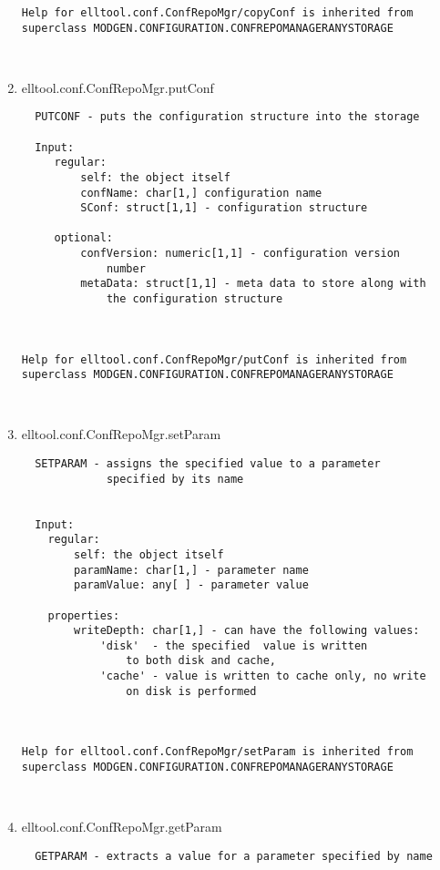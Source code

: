 \begin{enumerate}
\begin{lstlisting}
Help for elltool.conf.ConfRepoMgr/copyConf is inherited from superclass MODGEN.CONFIGURATION.CONFREPOMANAGERANYSTORAGE



\end{lstlisting}
\fontfamily{\familydefault}
\selectfont
\item {elltool.conf.ConfRepoMgr.putConf}
\selectfont
\begin{lstlisting}
  PUTCONF - puts the configuration structure into the storage

  Input:
     regular:
         self: the object itself
         confName: char[1,] configuration name
         SConf: struct[1,1] - configuration structure

     optional:
         confVersion: numeric[1,1] - configuration version
             number
         metaData: struct[1,1] - meta data to store along with
             the configuration structure



Help for elltool.conf.ConfRepoMgr/putConf is inherited from superclass MODGEN.CONFIGURATION.CONFREPOMANAGERANYSTORAGE



\end{lstlisting}
\fontfamily{\familydefault}
\selectfont
\item {elltool.conf.ConfRepoMgr.setParam}
\selectfont
\begin{lstlisting}
  SETPARAM - assigns the specified value to a parameter
             specified by its name


  Input:
    regular:
        self: the object itself
        paramName: char[1,] - parameter name
        paramValue: any[ ] - parameter value

    properties:
        writeDepth: char[1,] - can have the following values:
            'disk'  - the specified  value is written
                to both disk and cache,
            'cache' - value is written to cache only, no write
                on disk is performed



Help for elltool.conf.ConfRepoMgr/setParam is inherited from superclass MODGEN.CONFIGURATION.CONFREPOMANAGERANYSTORAGE



\end{lstlisting}
\fontfamily{\familydefault}
\selectfont
\item {elltool.conf.ConfRepoMgr.getParam}
\selectfont
\begin{lstlisting}
  GETPARAM - extracts a value for a parameter specified by name


\end{lstlisting}
\end{enumerate}
